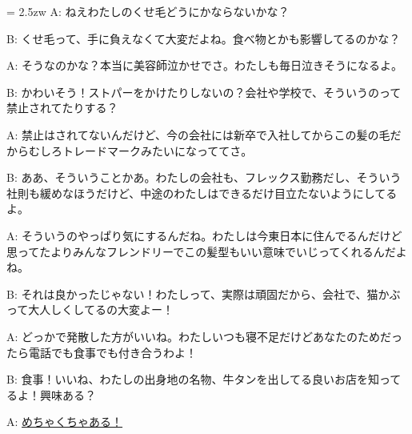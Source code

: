 \documentclass[11pt]{amsart}
\title{}
\author{}
\newenvironment{hangall}[1]{\hangindent = 2.5zw\everypar{\hangindent = 2.5zw}}{}
\begin{document}
\maketitle
\begin{hangall}{}%
A: ねえわたしのくせ毛どうにかならないかな？

B: くせ毛って、手に負えなくて大変だよね。食べ物とかも影響してるのかな？

A: そうなのかな？本当に美容師泣かせでさ。わたしも毎日泣きそうになるよ。

B: かわいそう！ストパーをかけたりしないの？会社や学校で、そういうのって禁止されてたりする？

A: 禁止はされてないんだけど、今の会社には新卒で入社してからこの髪の毛だからむしろトレードマークみたいになっててさ。

B: ああ、そういうことかあ。わたしの会社も、フレックス勤務だし、そういう社則も緩めなほうだけど、中途のわたしはできるだけ目立たないようにしてるよ。

A: そういうのやっぱり気にするんだね。わたしは今東日本に住んでるんだけど思ってたよりみんなフレンドリーでこの髪型もいい意味でいじってくれるんだよね。

B: それは良かったじゃない！わたしって、実際は頑固だから、会社で、猫かぶって大人しくしてるの大変よー！

A: どっかで発散した方がいいね。わたしいつも寝不足だけどあなたのためだったら電話でも食事でも付き合うわよ！

B: 食事！いいね、わたしの出身地の名物、牛タンを出してる良いお店を知ってるよ！興味ある？

A: \ul{めちゃくちゃある！}\end{hangall}
\end{document}
